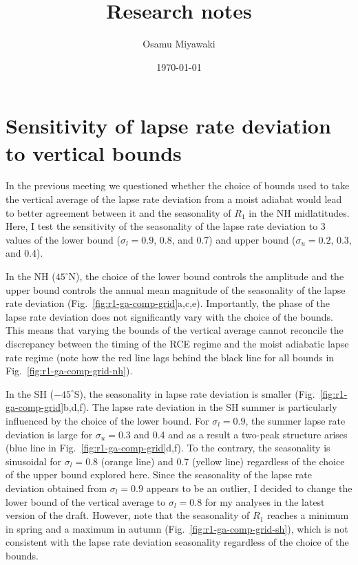 \documentclass{article}
\title{Research notes}
\date{\today}
\author{Osamu Miyawaki}
\begin{document}
\maketitle

\section{Sensitivity of lapse rate deviation to vertical bounds}

In the previous meeting we questioned whether the choice of bounds used to take the vertical average of the lapse rate deviation from a moist adiabat would lead to better agreement between it and the seasonality of $R_1$ in the NH midlatitudes. Here, I test the sensitivity of the seasonality of the lapse rate deviation to 3 values of the lower bound ($\sigma_l = 0.9$, 0.8, and 0.7) and upper bound ($\sigma_u=0.2$, 0.3, and 0.4).

In the NH ($45^\circ$N), the choice of the lower bound controls the amplitude and the upper bound controls the annual mean magnitude of the seasonality of the lapse rate deviation (Fig.~\ref{fig:r1-ga-comp-grid}a,c,e). Importantly, the phase of the lapse rate deviation does not significantly vary with the choice of the bounds. This means that varying the bounds of the vertical average cannot reconcile the discrepancy between the timing of the RCE regime and the moist adiabatic lapse rate regime (note how the red line lags behind the black line for all bounds in Fig.~\ref{fig:r1-ga-comp-grid-nh}).

In the SH ($-45^\circ$S), the seasonality in lapse rate deviation is smaller (Fig.~\ref{fig:r1-ga-comp-grid}b,d,f). The lapse rate deviation in the SH summer is particularly influenced by the choice of the lower bound. For $\sigma_l=0.9$, the summer lapse rate deviation is large for $\sigma_u=0.3$ and 0.4 and as a result a two-peak structure arises (blue line in Fig.~\ref{fig:r1-ga-comp-grid}d,f). To the contrary, the seasonality is sinusoidal for $\sigma_l=0.8$ (orange line) and 0.7 (yellow line) regardless of the choice of the upper bound explored here. Since the seasonality of the lapse rate deviation obtained from $\sigma_l=0.9$ appears to be an outlier, I decided to change the lower bound of the vertical average to $\sigma_l=0.8$ for my analyses in the latest version of the draft. However, note that the seasonality of $R_1$ reaches a minimum in spring and a maximum in autumn (Fig.~\ref{fig:r1-ga-comp-grid-sh}), which is not consistent with the lapse rate deviation seasonality regardless of the choice of the bounds. 
\end{document}
